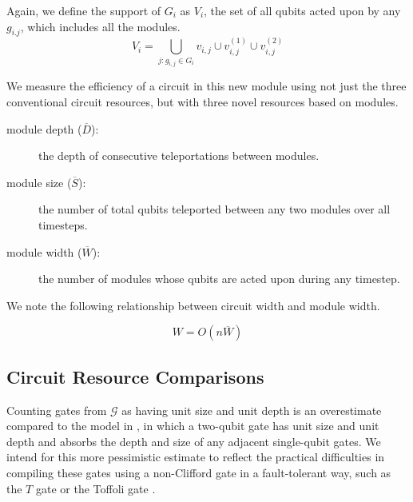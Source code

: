 \documentclass[twoside]{article}
\begin{document}
{\begin{itemize}
Again, we define the support of $G_i$
as $V_i$, the set of all qubits acted upon by any $g_{i.j}$, which
includes all the modules.
\begin{equation}
V_i = \bigcup_{j: g_{i,j} \in G_i} v_{i,j} \cup v^{(1)}_{i,j} \cup v^{(2)}_{i,j} 
\end{equation}

\end{itemize}
} %

We measure the efficiency of a circuit in this new module using not just
the three conventional circuit resources, but with three novel resources
based on modules.

\begin{description}

\item[module depth ($\overline{D}$):] the depth of consecutive teleportations between modules.
\item[module size ($\overline{S}$):] the number of total qubits teleported between any two modules over all timesteps.
\item[module width ($\overline{W}$):] the number of modules whose qubits are
acted upon during any timestep.

\end{description}



We note the following relationship between circuit width and
module width.

\begin{equation}
W = O(n\overline{W})
\label{eqn:module-width}
\end{equation}

\subsection{Circuit Resource Comparisons}

Counting gates from $\mathcal{G}$ as having unit size and unit depth
is
an overestimate compared to the model in \cite{Kutin2006}, in which a
two-qubit gate has unit size and unit depth and
absorbs the depth and size of any adjacent single-qubit gates. We intend
for this more pessimistic estimate to reflect the practical difficulties
in compiling these gates using a non-Clifford gate in a fault-tolerant way,
such as the $T$ gate or the Toffoli gate
\cite{Fowler2011}.
\end{document}
